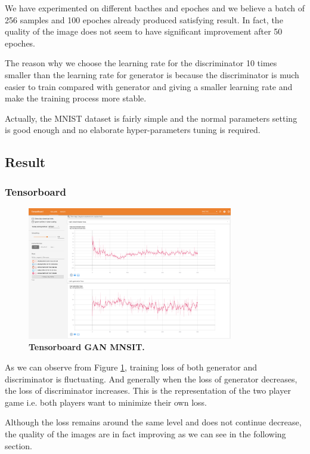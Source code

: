 \documentclass{article}
\newcommand{\mycaption}[2]{\caption[#1]{\textbf{#1.} #2}}
\begin{document}
We have experimented on different bacthes and epoches and we believe a batch of 256 samples and 100 epoches already produced satisfying result. 
In fact, the quality of the image does not seem to have significant improvement after 50 epoches.

The reason why we choose the learning rate for the discriminator 10 times smaller than the learning rate for generator is because the discriminator is much easier to train compared with generator and giving a smaller learning rate and make the training process more stable.

Actually, the MNIST dataset is fairly simple and the normal parameters setting is good enough and no elaborate hyper-parameters tuning is required.

\subsection{Result}

\subsubsection{Tensorboard}

\begin{figure}[!htb]
  \centering
  \includegraphics[width=0.8\textwidth]{imgs/tensorboard-GAN-MNIST.png}
  \mycaption{Tensorboard GAN MNSIT}{}
  \label{fig:TB_GAN_MNSIT}
\end{figure}

As we can observe from Figure \ref{fig:TB_GAN_MNSIT}, training loss of both generator and discriminator is fluctuating. 
And generally when the loss of generator decreases, the loss of discriminator increases. This is the representation of the two player game i.e. both players want to minimize their own loss.

Although the loss remains around the same level and does not continue decrease, the quality of the images are in fact improving as we can see in the following section.
\end{document}
